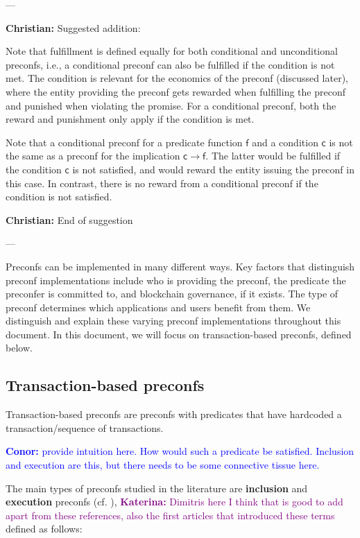 \documentclass[a4paper]{article}
\theoremstyle{boldstyle}
\newcommand{\cm}[1]{\textcolor{blue}{\textbf{Conor:} #1}}
\newcommand{\ks}[1]{\textcolor{purple}{\textbf{Katerina:} #1}}
\newcommand{\chm}[1]{\textcolor{OliveGreen}{\textbf{Christian:} #1}}
\begin{document}
    ---

    \chm{Suggested addition:}
    
    Note that fulfillment is defined equally for both conditional and unconditional preconfs, i.e., a conditional preconf can also be fulfilled if the condition is not met. The condition is relevant for the economics of the preconf (discussed later), where the entity providing the preconf gets rewarded when fulfilling the preconf and punished when violating the promise. For a conditional preconf, both the reward and punishment only apply if the condition is met.

    Note that a conditional preconf for a predicate function $\mathsf{f}$ and a condition $\mathsf{c}$ is not the same as a preconf for the implication $\mathsf{c} \rightarrow \mathsf{f}$. The latter would be fulfilled if the condition $\mathsf{c}$ is not satisfied, and would reward the entity issuing the preconf in this case. In contrast, there is no reward from a conditional preconf if the condition is not satisfied.


    \chm{End of suggestion}
    
    ---

     Preconfs can be implemented in many different ways. Key factors that distinguish preconf implementations include who is providing the preconf, the predicate the preconfer is committed to, and blockchain governance, if it exists. The type of preconf determines which applications and users benefit from them.  We distinguish and explain these varying preconf implementations throughout this document. In this document, we will focus on transaction-based preconfs, defined below.
     

    \subsection{Transaction-based preconfs}\label{sec:tx_based_preconfs}
    Transaction-based preconfs are preconfs with predicates that have hardcoded a transaction/sequence of transactions. 
    
    \cm{provide intuition here. How would such a predicate be satisfied. Inclusion and execution are this, but there needs to be some connective tissue here.} 
    
    The main types of preconfs studied in the literature are \textbf{inclusion} and \textbf{execution} preconfs (cf. \cite{W:APricingModelforInclusionPreconfirmations,W:AnalysingExpectedProposerRevenuefromPreconfirmations}), \ks{Dimitris here I think that is good to add apart from these references, also the first articles that introduced these terms} defined as follows:   
    
\end{document}
